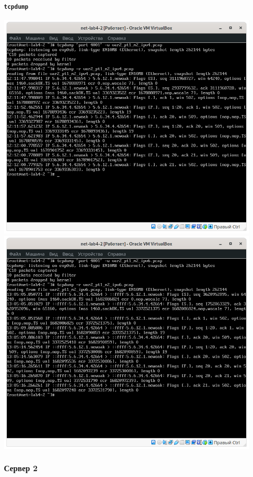 \paragraph{\texttt{tcpdump}}
\begin{center}
    \includegraphics[width=.49\textwidth]{screenshots/var2-tcpdump1-ipv4}
    \includegraphics[width=.49\textwidth]{screenshots/var2-tcpdump1-ipv6}
\end{center}

\subsubsection{Сервер 2}
